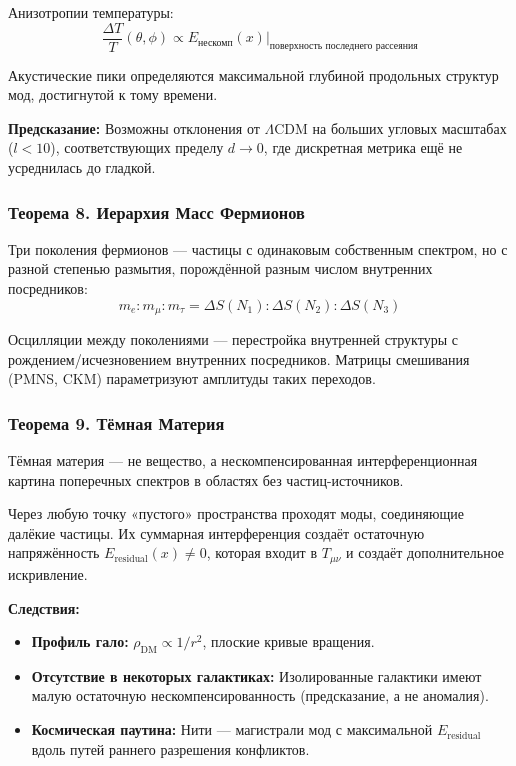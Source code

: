 \documentclass[12pt,a4paper]{article}
\begin{document}
Анизотропии температуры:
\begin{equation}
    \frac{\Delta T}{T}(\theta, \phi) \propto E_{\text{нескомп}}(x)\big|_{\text{поверхность последнего рассеяния}}
\end{equation}

Акустические пики определяются максимальной глубиной продольных структур мод, достигнутой к тому времени.

\textbf{Предсказание:} Возможны отклонения от $\Lambda$CDM на больших угловых масштабах ($l < 10$), соответствующих пределу $d \to 0$, где дискретная метрика ещё не усреднилась до гладкой.

\subsubsection{Теорема 8. Иерархия Масс Фермионов}
Три поколения фермионов --- частицы с одинаковым собственным спектром, но с разной степенью размытия, порождённой разным числом внутренних посредников:
\begin{equation}
    m_e : m_\mu : m_\tau = \Delta S(N_1) : \Delta S(N_2) : \Delta S(N_3)
\end{equation}

Осцилляции между поколениями --- перестройка внутренней структуры с рождением/исчезновением внутренних посредников. Матрицы смешивания (PMNS, CKM) параметризуют амплитуды таких переходов.

\subsubsection{Теорема 9. Тёмная Материя}
Тёмная материя --- не вещество, а нескомпенсированная интерференционная картина поперечных спектров в областях без частиц-источников.

Через любую точку «пустого» пространства проходят моды, соединяющие далёкие частицы. Их суммарная интерференция создаёт остаточную напряжённость $E_{\text{residual}}(x) \neq 0$, которая входит в $T_{\mu\nu}$ и создаёт дополнительное искривление.

\textbf{Следствия:}
\begin{itemize}
    \item \textbf{Профиль гало:} $\rho_{\text{DM}} \propto 1/r^2$, плоские кривые вращения.
    \item \textbf{Отсутствие в некоторых галактиках:} Изолированные галактики имеют малую остаточную нескомпенсированность (предсказание, а не аномалия).
    \item \textbf{Космическая паутина:} Нити --- магистрали мод с максимальной $E_{\text{residual}}$ вдоль путей раннего разрешения конфликтов.
\end{itemize}
\end{document}
